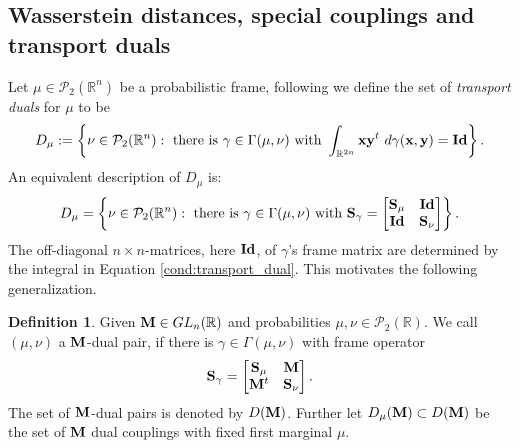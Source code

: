 \documentclass{amsart}
\numberwithin{equation}{section}
\newcommand\cP{{\mathcal P}}
\newcommand\bM{{\bf M}}
\newcommand\bS{{\bf S}}
\newcommand\R{{\mathbb R}}
\newcommand\id{{\operatorname{\bf Id}}}
\theoremstyle{plain}
\theoremstyle{definition}
\newtheorem{definition}[subsection]{Definition}
\begin{document}
\subsection{Wasserstein distances, special couplings and transport duals} 
Let $\mu \in \cP_{2}(\R^n)$ be a probabilistic frame, following \cite{wickman2017duality} we define the set of {\em transport duals} for $\mu$ to be  
\begin{equation}
\label{cond:transport_dual}  D_{\mu}:=\left\{\nu \in \cP_2(\R^n):\ \text{there is } \gamma \in \Gamma(\mu,\nu) \text{ with } \int_{ \R^{2n} } {\bf x}{\bf y}^t\ d\gamma({\bf x},{\bf y}) = \id \right\}. 
\end{equation} 
An equivalent description of $D_{\mu}$ is:  
\begin{equation}
\label{cond:transport_dual_frame_op}  D_{\mu}=\left\{\nu \in \cP_2(\R^n):\ \text{there is } \gamma \in \Gamma(\mu,\nu) \text{ with } 
{\bf S}_{\gamma}=\begin{bmatrix}
\bS_{\mu} & {\bf \id} \\
{\bf \id} & \bS_{\nu}
\end{bmatrix}
\right \}.
\end{equation} 
The off-diagonal $n \times n$-matrices, here $\id$, of $\gamma$'s frame matrix are determined by the integral in Equation  \ref{cond:transport_dual}.  
This motivates the following generalization. 
\begin{definition}
Given $\bM \in GL_n(\R)$ and probabilities $\mu, \nu \in \cP_2(\R)$. We call $(\mu, \nu)$ a $\bM$-dual pair, 
if there is $\gamma \in \Gamma(\mu,\nu)$ with frame operator 
\begin{equation}\label{M_frame_matrix}
{\bf S}_{\gamma}=\begin{bmatrix}
\bS_{\mu} & \bM \\
\bM^t & \bS_{\nu}
\end{bmatrix}.\end{equation}
The set of $\bM$-dual pairs is denoted by $D(\bM)$. Further let $D_{\mu}(\bM) \subset D(\bM)$ be the set of $\bM$ dual couplings with fixed 
first marginal $\mu$. 
\end{definition}
\end{document}
